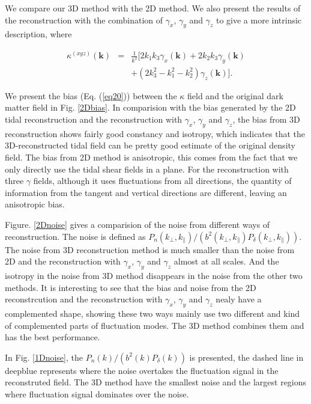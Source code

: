 \documentclass[aps,prd,twocolumn,showpacs,superscriptaddress,groupedaddress,nofootinbib]{revtex4}  %
\begin{document}
We compare our 3D method with the 2D method. We also present the results of the reconstruction with the combination of $\gamma_{x}$, $\gamma_{y}$ and $\gamma_{z}$ to give a more intrinsic description, where  

\begin{eqnarray}
\kappa^{(xyz)}(\bm{k})&=&\frac{1}{k^2}
[2k_1k_3\gamma_x(\bm{k})\nonumber+2k_2k_3\gamma_y(\bm{k})\\
&&+(2k_3^2-k_1^2-k_2^2)\gamma_z(\bm{k})].
\label{eqxyz}
\end{eqnarray}

We present the bias (Eq. (\ref{eq20})) between the $\kappa$ field and the original dark matter field in Fig. \ref{2Dbias}. In comparision with the bias generated by the 2D tidal reconstruction and the reconstruction with $\gamma_{x}$, $\gamma_{y}$ and $\gamma_{z}$, the bias from 3D reconstruction shows fairly good constancy and isotropy, which indicates that the 3D-reconstructed tidal field can be pretty good estimate of the original density field. The bias from 2D method is anisotropic, this comes from the fact that we only directly use the tidal shear fields in a plane. For the reconstruction with three $\gamma$ fields, although it uses fluctuations from all directions, the quantity of information from the tangent and vertical directions are different, leaving an anisotropic bias. 

Figure. \ref{2Dnoise} gives a comparision of the noise from different ways of reconstruction. The noise is defined as $P_{n}(k_\perp, k_\parallel)/(b^2(k_\perp, k_\parallel)P_{\delta}(k_\perp, k_\parallel))$. The noise from 3D reconstruction method is much smaller than the noise from 2D and the reconstruction with $\gamma_{x}$, $\gamma_{y}$ and $\gamma_{z}$ almost at all scales. And the isotropy in the noise from 3D method disappears in the noise from the other two methods. It is interesting to see that the bias and noise from the 2D reconstrcution and the reconstruction with $\gamma_{x}$, $\gamma_{y}$ and $\gamma_{z}$ nealy have a complemented shape, showing these two ways mainly use two different and kind of complemented parts of fluctuation modes. The 3D method combines them and has the best performance.

In Fig. \ref{1Dnoise}, the $P_{n}(k)/(b^2(k)P_{\delta}(k))$ is presented, the dashed line in deepblue represents where the noise overtakes the fluctuation signal in the reconstruted field. The 3D method have the smallest noise and the largest regions where fluctuation signal dominates over the noise.
\end{document}
